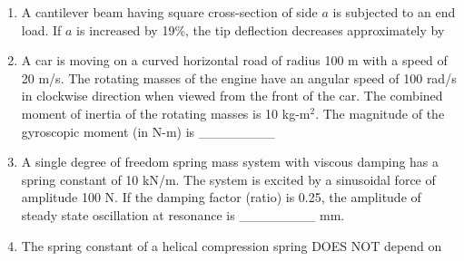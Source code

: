 \documentclass[journal,11pt,onecolumn]{IEEEtran}
\begin{document}
\begin{enumerate}
\begin{enumerate}

          \end{enumerate}

    \item A cantilever beam having square cross-section of side $a$ is subjected to an end load. If $a$ is increased by 19\%, the tip deflection decreases approximately by

          \begin{enumerate}


          \end{enumerate}

    \item A car is moving on a curved horizontal road of radius 100 m with a speed of 20 m/s. The rotating masses of the engine have an angular speed of 100 rad/s in clockwise direction when viewed from the front of the car. The combined moment of inertia of the rotating masses is 10 kg-m$^2$. The magnitude of the gyroscopic moment (in N-m) is \_\_\_\_\_\_\_\_

    \item A single degree of freedom spring mass system with viscous damping has a spring constant of 10 kN/m. The system is excited by a sinusoidal force of amplitude 100 N. If the damping factor (ratio) is 0.25, the amplitude of steady state oscillation at resonance is \_\_\_\_\_\_\_\_ mm.

    \item The spring constant of a helical compression spring DOES NOT depend on


\end{enumerate}
\end{document}
